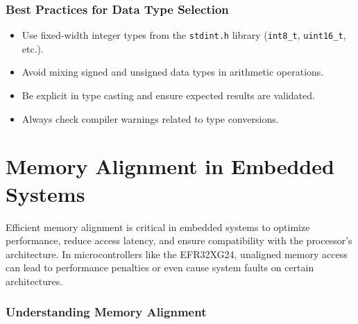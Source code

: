 \documentclass[
  9pt,
  letterpaper,
  abstract,
  titlepage]{scrbook}
\begin{document}
\subsubsection{Best Practices for Data Type
Selection}\label{best-practices-for-data-type-selection}

\begin{itemize}
\item
  Use fixed-width integer types from the \texttt{stdint.h} library
  (\texttt{int8\_t}, \texttt{uint16\_t}, etc.).
\item
  Avoid mixing signed and unsigned data types in arithmetic operations.
\item
  Be explicit in type casting and ensure expected results are validated.
\item
  Always check compiler warnings related to type conversions.
\end{itemize}

\section{Memory Alignment in Embedded
Systems}\label{memory-alignment-in-embedded-systems}

Efficient memory alignment is critical in embedded systems to optimize
performance, reduce access latency, and ensure compatibility with the
processor's architecture. In microcontrollers like the EFR32XG24,
unaligned memory access can lead to performance penalties or even cause
system faults on certain architectures.

\subsubsection{Understanding Memory
Alignment}\label{understanding-memory-alignment}
\end{document}

